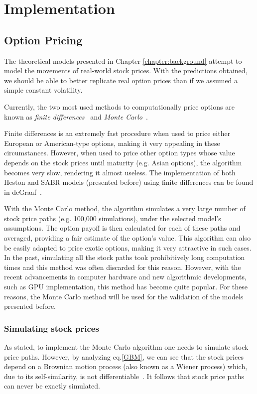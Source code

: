 \chapter{Implementation}
\label{chapter:implementation}
\section{Option Pricing}
\label{section:Option Pricing}
The theoretical models presented in Chapter \ref{chapter:background} attempt to model the movements of real-world stock prices. With the predictions obtained, we should be able to better replicate real option prices than if we assumed a simple constant volatility.

Currently, the two most used methods to computationally price options are known as \emph{finite differences}~\cite{Hull} and \emph{Monte Carlo}~\cite{Glasserman}.

Finite differences is an extremely fast procedure when used to price either European or American-type options, making it very appealing in these circumstances. However, when used to price other option types whose value depends on the stock prices until maturity (e.g. Asian options), the algorithm becomes very slow, rendering it almost useless.
The implementation of both Heston and SABR models (presented before) using finite differences can be found in deGraaf~\cite{deGraaf}.


With the Monte Carlo method, the algorithm simulates a very large number of stock price paths (e.g. 100,000 simulations), under the selected model's assumptions. The option payoff is then calculated for each of these paths and averaged, providing a fair estimate of the option's value. This algorithm can also be easily adapted to price exotic options, making it very attractive in such cases.
In the past, simulating all the stock paths took prohibitively long computation times and this method was often discarded for this reason. However, with the recent advancements in computer hardware and new algorithmic developments, such as GPU implementation, this method has become quite popular.
For these reasons, the Monte Carlo method will be used for the validation of the models presented before.


\subsection{Simulating stock prices}
\label{subsection:Simulating stock prices}
As stated, to implement the Monte Carlo algorithm one needs to simulate stock price paths. However, by analyzing eq.\eqref{GBM}, we can see that the stock prices depend on a Brownian motion process (also known as a Wiener process) which, due to its self-similarity, is not differentiable~\cite{Mikosch}. It follows that stock price paths can never be exactly simulated.

